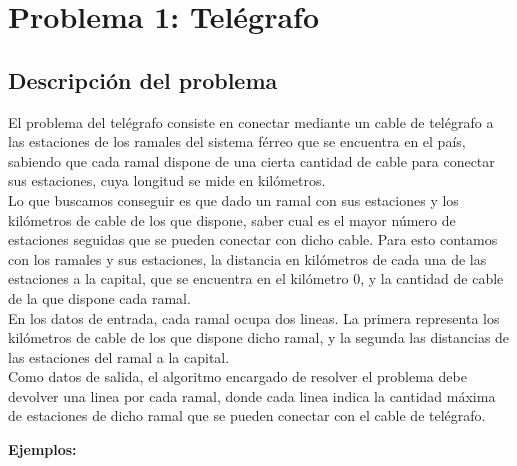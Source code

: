 \documentclass[10pt, a4paper]{article}
\author{Algoritmos y Estructuras de Datos III, DC, UBA.}
\date{}
\title{}
\begin{document}
\section{Problema 1: Tel\'egrafo}
\subsection{Descripci\'on del problema}

El problema del tel\'egrafo consiste en conectar mediante un cable de tel\'egrafo a las estaciones de los ramales del sistema f\'erreo que se encuentra en el pa\'is, sabiendo que cada ramal dispone de una cierta cantidad de cable para conectar sus estaciones, cuya longitud se mide en kil\'ometros. \\
Lo que buscamos conseguir es que dado un ramal con sus estaciones y los kil\'ometros de cable de los que dispone, saber cual es el mayor n\'umero de estaciones seguidas que se pueden conectar con dicho cable. Para esto contamos con los ramales y sus estaciones, la distancia en kil\'ometros de cada una de las estaciones  a la capital, que se encuentra en el kil\'ometro $0$, y la cantidad de cable de la que dispone cada ramal.\\
En los datos de entrada, cada ramal ocupa dos lineas. La primera representa los kil\'ometros de cable de los que dispone dicho ramal, y la segunda las distancias de las estaciones del ramal a la capital.\\
Como datos de salida, el algoritmo encargado de resolver el problema debe devolver una linea por cada ramal, donde cada linea indica la cantidad m\'axima de estaciones de dicho ramal que se pueden conectar con el cable de tel\'egrafo.
\begin{flushleft}
\textbf{Ejemplos:}\\
\end{flushleft}
\end{document}
